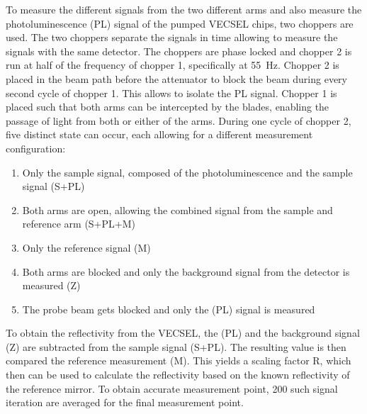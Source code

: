 To measure the different signals from the two different arms and also measure the photoluminescence (PL) signal of the pumped VECSEL chips, two choppers are used. The two choppers separate the signals in time allowing to measure the signals with the same detector. The choppers are phase locked and chopper 2 is run at half of the frequency of chopper 1, specifically at \qty{55}{\Hz}. Chopper 2 is placed in the beam path before the attenuator to block the beam during every second cycle of chopper 1. This allows to isolate the PL signal. Chopper 1 is placed such that both arms can be intercepted by the blades, enabling the passage of light from both or either of the arms. During one cycle of chopper 2, five distinct state can occur, each allowing for a different measurement configuration:
\begin{enumerate}
    \item Only the sample signal, composed of the photoluminescence and the sample signal (S+PL)
    \item Both arms are open, allowing the combined signal from the sample and reference arm  (S+PL+M)
    \item Only the reference signal (M)
    \item Both arms are blocked and only the background signal from the detector is measured (Z)
    \item The probe beam gets blocked and only the (PL) signal is measured
\end{enumerate}

To obtain the reflectivity from the VECSEL, the (PL) and the background signal (Z) are subtracted from the sample signal (S+PL). The resulting value is then compared the reference measurement (M). This yields a scaling factor R, which then can be used to calculate the reflectivity based on the known reflectivity of the reference mirror. To obtain accurate measurement point, 200 such signal iteration are averaged for the final measurement point.
\newpage

